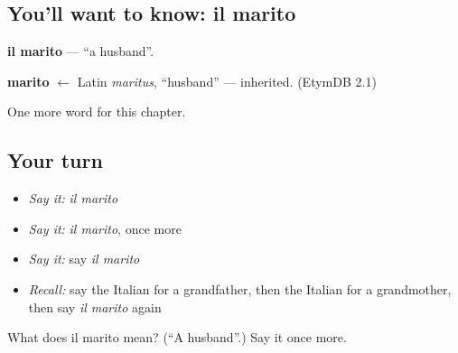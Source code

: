 \subsection*{You'll want to know: il marito}
\textbf{il marito} — \textquotedblleft{}a husband\textquotedblright{}.

\begin{cousinweb}
\textbf{marito} $\leftarrow$ Latin \emph{maritus}, \textquotedblleft{}husband\textquotedblright{} — inherited. (EtymDB 2.1)
\end{cousinweb}

\begin{grammarlens}[title={What you've built}]
One more word for this chapter.
\end{grammarlens}

\subsection*{Your turn}
\begin{itemize}
\raggedright
  \item \emph{Say it:} \emph{il marito}
  \item \emph{Say it:} \emph{il marito}, once more
  \item \emph{Say it:} say \emph{il marito}
  \item \emph{Recall:} say the Italian for a grandfather, then the Italian for a grandmother, then say \emph{il marito} again
\end{itemize}

\begin{tcolorbox}[breakable,colback=teal!4,colframe=teal!35!black,title={Before you move on}]
What does il marito mean? (\textquotedblleft{}A husband\textquotedblright{}.) Say it once more.
\end{tcolorbox}
